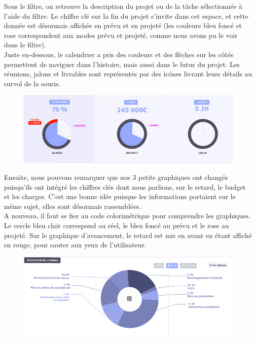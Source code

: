 \documentclass[12pt]{report}
\begin{document}
Sous le filtre, on retrouve la description du projet ou de la tâche sélectionnée à l'aide du filtre. Le chiffre clé sur la fin du projet s'invite dans cet espace, et cette donnée est désormais affichée en prévu et en projeté (les couleurs bleu foncé et rose correspondent aux modes prévu et projeté, comme nous avons pu le voir dans le filtre).\\
Juste en-dessous, le calendrier a pris des couleurs et des flèches sur les côtés permettent de naviguer dans l'histoire, mais aussi dans le futur du projet. Les réunions, jalons et livrables sont représentés par des icônes livrant leurs détails au survol de la souris.\\

\begin{figure}[H]
	\centering
	\includegraphics[width=1\textwidth]{pictures/maquetteVersusmind/3graphs.jpg}
	\caption{}
	\label{14}
\end{figure}

Ensuite, nous pouvons remarquer que nos 3 petits graphiques ont changés puisqu'ils ont intégré les chiffres clés dont nous parlions, sur le retard, le budget et les charges. C'est une bonne idée puisque les informations portaient sur le même sujet, elles sont désormais rassemblées.\\

A nouveau, il faut se fier au code colorimétrique pour comprendre les graphiques. Le cercle bleu clair correspond au réel, le bleu foncé au prévu et le rose au projeté. Sur le graphique d'avancement, le retard est mis en avant en étant affiché en rouge, pour sauter aux yeux de l'utilisateur.\\

\begin{figure}[H]
	\centering
	\includegraphics[width=1\textwidth]{pictures/maquetteVersusmind/repartitionInit.jpg}
	\caption{}
	\label{12}
\end{figure}
\end{document}
